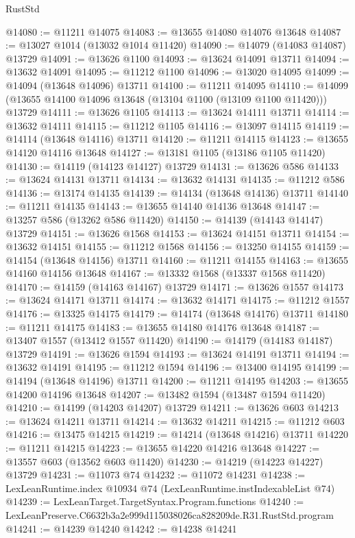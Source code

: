 \begin{lexlean}{RustStd}
\begin{coremodule}
@14080 := @11211 @14075
@14083 := @13655 @14080 @14076 @13648
@14087 := @13027 @1014 (@13032 @1014 @11420)
@14090 := @14079 (@14083 @14087) @13729
@14091 := @13626 @1100
@14093 := @13624 @14091 @13711
@14094 := @13632 @14091
@14095 := @11212 @1100
@14096 := @13020 @14095
@14099 := @14094 (@13648 @14096) @13711
@14100 := @11211 @14095
@14110 := @14099 (@13655 @14100 @14096 @13648 (@13104 @1100 (@13109 @1100 @11420))) @13729
@14111 := @13626 @1105
@14113 := @13624 @14111 @13711
@14114 := @13632 @14111
@14115 := @11212 @1105
@14116 := @13097 @14115
@14119 := @14114 (@13648 @14116) @13711
@14120 := @11211 @14115
@14123 := @13655 @14120 @14116 @13648
@14127 := @13181 @1105 (@13186 @1105 @11420)
@14130 := @14119 (@14123 @14127) @13729
@14131 := @13626 @586
@14133 := @13624 @14131 @13711
@14134 := @13632 @14131
@14135 := @11212 @586
@14136 := @13174 @14135
@14139 := @14134 (@13648 @14136) @13711
@14140 := @11211 @14135
@14143 := @13655 @14140 @14136 @13648
@14147 := @13257 @586 (@13262 @586 @11420)
@14150 := @14139 (@14143 @14147) @13729
@14151 := @13626 @1568
@14153 := @13624 @14151 @13711
@14154 := @13632 @14151
@14155 := @11212 @1568
@14156 := @13250 @14155
@14159 := @14154 (@13648 @14156) @13711
@14160 := @11211 @14155
@14163 := @13655 @14160 @14156 @13648
@14167 := @13332 @1568 (@13337 @1568 @11420)
@14170 := @14159 (@14163 @14167) @13729
@14171 := @13626 @1557
@14173 := @13624 @14171 @13711
@14174 := @13632 @14171
@14175 := @11212 @1557
@14176 := @13325 @14175
@14179 := @14174 (@13648 @14176) @13711
@14180 := @11211 @14175
@14183 := @13655 @14180 @14176 @13648
@14187 := @13407 @1557 (@13412 @1557 @11420)
@14190 := @14179 (@14183 @14187) @13729
@14191 := @13626 @1594
@14193 := @13624 @14191 @13711
@14194 := @13632 @14191
@14195 := @11212 @1594
@14196 := @13400 @14195
@14199 := @14194 (@13648 @14196) @13711
@14200 := @11211 @14195
@14203 := @13655 @14200 @14196 @13648
@14207 := @13482 @1594 (@13487 @1594 @11420)
@14210 := @14199 (@14203 @14207) @13729
@14211 := @13626 @603
@14213 := @13624 @14211 @13711
@14214 := @13632 @14211
@14215 := @11212 @603
@14216 := @13475 @14215
@14219 := @14214 (@13648 @14216) @13711
@14220 := @11211 @14215
@14223 := @13655 @14220 @14216 @13648
@14227 := @13557 @603 (@13562 @603 @11420)
@14230 := @14219 (@14223 @14227) @13729
@14231 := @11073 @74
@14232 := @11072 @14231
@14238 := LexLeanRuntime.index @10934 @74 (LexLeanRuntime.instIndexableList @74)
@14239 := LexLeanTarget.TargetSyntax.Program.functions
@14240 := LexLeanPreserve.C6632b3a2e999d115038026ca828209de.R31.RustStd.program
@14241 := @14239 @14240
@14242 := @14238 @14241

\end{coremodule}
\end{lexlean}
